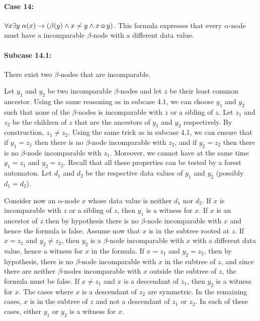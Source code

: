 \documentclass{CSML}
\newcommand\dataeq{\ensuremath{\sim}}
\renewcommand\parallel{\mathbin{\!<\mkern-12mu>\!}}
\begin{document}
\paragraph{\bf Case 14:}
$\forall x \exists y\; \alpha(x) \to (\beta(y) \wedge x \not\dataeq y \wedge x \parallel y)$.
This formula expresses that every $\alpha$-node 
must have a incomparable $\beta$-node with a different data value.

\paragraph{\bf Subcase 14.1:} 
There exist two $\beta$-nodes that are incomparable.

Let $y_1$ and $y_2$ be two incomparable $\beta$-nodes and let $z$ be their least
common ancestor. Using the same reasoning as in subcase 4.1, we can choose
$y_1$ and $y_2$ such that none of the $\beta$-nodes is incomparable with $z$ or a
sibling of $z$.  Let $z_1$ and $z_2$ be the children of $z$ that are the
ancestors of $y_1$ and $y_2$ respectively.  By construction, $z_1\neq z_2$.
Using the same trick as in subcase 4.1,
we can ensure that if $y_1 = z_1$ then there is no $\beta$-node
incomparable with $z_2$, and
if $y_2 = z_2$ then there is no $\beta$-node incomparable with $z_1$. 
Moreover, we cannot have at the same time $y_1=z_1$ and $y_2=z_2$. 
Recall that all these properties can be tested by a forest automaton. 
Let $d_1$ and $d_2$ be the respective data values of $y_1$ and $y_2$ (possibly $d_1=d_2$). 

Consider now an $\alpha$-node $x$ whose data value is neither $d_1$ nor $d_2$. 
If $x$ is incomparable with $z$ or a sibling of $z$, then $y_1$ is a witness for $x$. 
If $x$ is an ancestor of $z$ then by hypothesis there is no $\beta$-node incomparable 
with $x$ and hence the formula is false. 
Assume now that $x$ is in the subtree rooted at $z$. 
If $x = z_1$ and $y_2 \neq z_2$, then $y_2$ is a $\beta$-node
incomparable with $x$ with a different data value, hence a witness for $x$ in the formula.
If $x = z_1$ and $y_2 = z_2$, 
then by hypothesis, there is no $\beta$-node incomparable with $x$
in the subtree of $z$, and since there are neither $\beta$-nodes incomparable with $x$
outside the subtree of $z$, the formula must be false.
If $x \neq z_1$ and $x$ is a descendant of $z_1$, 
then $y_2$ is a witness for $x$.
The cases where $x$ is a descendant of $z_2$ are symmetric.
In the remaining cases, $x$ is in the subtree of $z$ 
and not a descendant of $z_1$ or $z_2$.
In each of these cases, either $y_1$ or $y_2$ is a witness for $x$.
\end{document}
